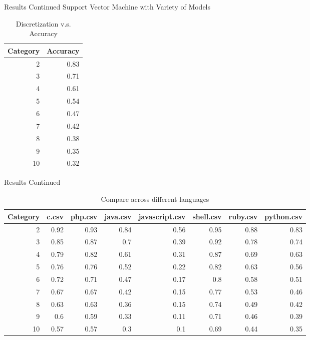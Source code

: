 \documentclass[presentation]{beamer}
\begin{document}
\begin{frame}{Results Continued}
  Support Vector Machine with Variety of Models
  \begin{table}
    \centering
    \begin{tabular}{r|r}
      Category & Accuracy\\
      \hline
      2 & 0.83\\
      3 & 0.71\\
      4 & 0.61\\
      5 & 0.54\\
      6 & 0.47\\
      7 & 0.42\\
      8 & 0.38\\
      9 & 0.35\\
      10 & 0.32\\
    \end{tabular}
    \caption{Discretization v.s. Accuracy}
  \end{table}
\end{frame}

\begin{frame}{Results Continued}
  \begin{table}
    \centering
    \scriptsize
    \begin{tabular}{r|r|r|r|r|r|r|r}
      Category & c.csv & php.csv & java.csv & javascript.csv & shell.csv & ruby.csv & python.csv\\
      \hline
      2 & 0.92 & 0.93 & 0.84 & 0.56 & 0.95 & 0.88 & 0.83\\
      3 & 0.85 & 0.87 & 0.7 & 0.39 & 0.92 & 0.78 & 0.74\\
      4 & 0.79 & 0.82 & 0.61 & 0.31 & 0.87 & 0.69 & 0.63\\
      5 & 0.76 & 0.76 & 0.52 & 0.22 & 0.82 & 0.63 & 0.56\\
      6 & 0.72 & 0.71 & 0.47 & 0.17 & 0.8 & 0.58 & 0.51\\
      7 & 0.67 & 0.67 & 0.42 & 0.15 & 0.77 & 0.53 & 0.46\\
      8 & 0.63 & 0.63 & 0.36 & 0.15 & 0.74 & 0.49 & 0.42\\
      9 & 0.6 & 0.59 & 0.33 & 0.11 & 0.71 & 0.46 & 0.39\\
      10 & 0.57 & 0.57 & 0.3 & 0.1 & 0.69 & 0.44 & 0.35\\
    \end{tabular}
    \caption{Compare across different languages}
  \end{table}
  
\end{frame}
\end{document}
